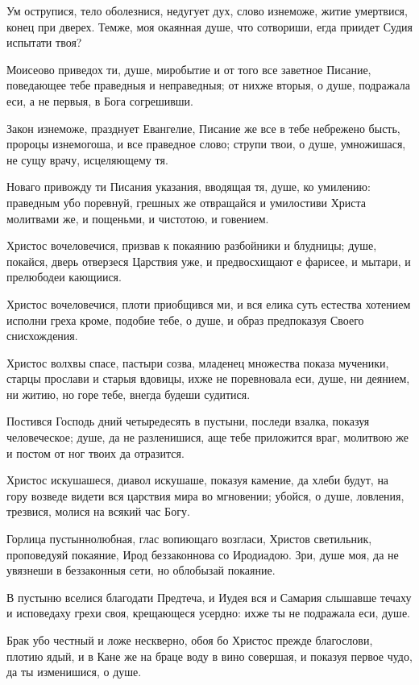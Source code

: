 Ум острупися, тело оболезнися, недугует дух, слово изнеможе, житие умертвися, конец при дверех. Темже, моя окаянная душе, что сотвориши, егда приидет Судия испытати твоя?

Моисеово приведох ти, душе, миробытие и от того все заветное Писание, поведающее тебе праведныя и неправедныя; от нихже вторыя, о душе, подражала еси, а не первыя, в Бога согрешивши.

Закон изнеможе, празднует Евангелие, Писание же все в тебе небрежено бысть, пророцы изнемогоша, и все праведное слово; струпи твои, о душе, умножишася, не сущу врачу, исцеляющему тя.

Новаго привожду ти Писания указания, вводящая тя, душе, ко умилению: праведным убо поревнуй, грешных же отвращайся и умилостиви Христа молитвами же, и пощеньми, и чистотою, и говением.

Христос вочеловечися, призвав к покаянию разбойники и блудницы; душе, покайся, дверь отверзеся Царствия уже, и предвосхищают е фарисее, и мытари, и прелюбодеи кающиися.

Христос вочеловечися, плоти приобщився ми, и вся елика суть естества хотением исполни греха кроме, подобие тебе, о душе, и образ предпоказуя Своего снисхождения.

Христос волхвы спасе, пастыри созва, младенец множества показа мученики, старцы прослави и старыя вдовицы, ихже не поревновала еси, душе, ни деянием, ни житию, но горе тебе, внегда будеши судитися.

Постився Господь дний четыредесять в пустыни, последи взалка, показуя человеческое; душе, да не разленишися, аще тебе приложится враг, молитвою же и постом от ног твоих да отразится.

Христос искушашеся, диавол искушаше, показуя камение, да хлеби будут, на гору возведе видети вся царствия мира во мгновении; убойся, о душе, ловления, трезвися, молися на всякий час Богу.

Горлица пустыннолюбная, глас вопиющаго возгласи, Христов светильник, проповедуяй покаяние, Ирод беззаконнова со Иродиадою. Зри, душе моя, да не увязнеши в беззаконныя сети, но облобызай покаяние.

В пустыню вселися благодати Предтеча, и Иудея вся и Самария слышавше течаху и исповедаху грехи своя, крещающеся усердно: ихже ты не подражала еси, душе.

Брак убо честный и ложе нескверно, обоя бо Христос прежде благослови, плотию ядый, и в Кане же на браце воду в вино совершая, и показуя первое чудо, да ты изменишися, о душе.


